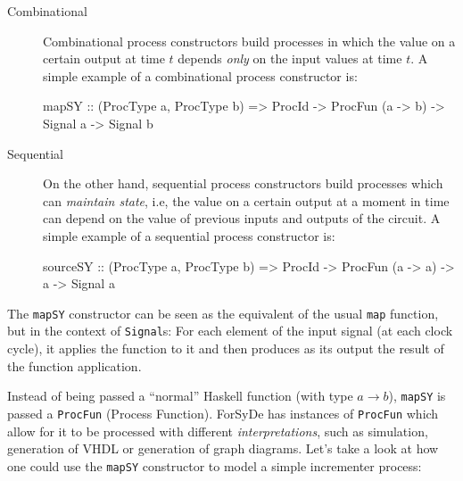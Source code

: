            \begin{description}

                \item[Combinational] Combinational process constructors build processes in which the
                    value on a certain output at time $t$ depends \emph{only} on the input values at
                    time $t$. A simple example of a combinational process constructor is:

                    \begin{haskellcode}
        mapSY :: (ProcType a, ProcType b) => ProcId
              -> ProcFun (a -> b) -> Signal a -> Signal b
                    \end{haskellcode}

                \item[Sequential] On the other hand, sequential process constructors build processes
                    which can \emph{maintain state}, i.e, the value on a certain output at a moment
                    in time can depend on the value of previous inputs and outputs of the circuit. A
                    simple example of a sequential process constructor is:

                    \begin{haskellcode}
        sourceSY :: (ProcType a, ProcType b) => ProcId
                 -> ProcFun (a -> a) -> a -> Signal a
                    \end{haskellcode}

            \end{description}

            The \texttt{mapSY} constructor can be seen as the equivalent of the usual \texttt{map}
            function, but in the context of \texttt{Signal}s: For each element of the input signal
            (at each clock cycle), it applies the function to it and then produces as its output the
            result of the function application.

            Instead of being passed a ``normal'' Haskell function (with type $a → b$),
            \texttt{mapSY} is passed a \texttt{ProcFun} (Process Function). ForSyDe has instances of
            \texttt{ProcFun} which allow for it to be processed with different
            \emph{interpretations}, such as simulation, generation of VHDL or generation of graph
            diagrams. Let's take a look at how one could use the \texttt{mapSY} constructor to model
            a simple incrementer process:

